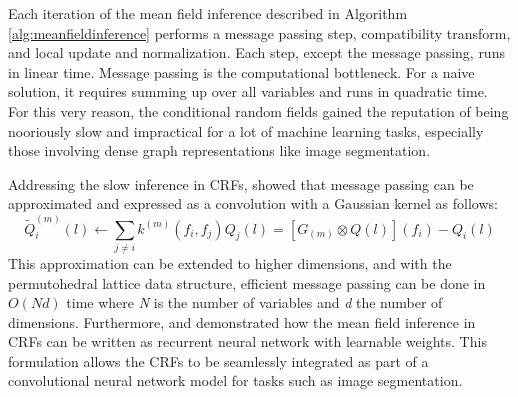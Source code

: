 \documentclass[journal]{IEEEtran}
\begin{document}
Each iteration of the mean field inference described in Algorithm \ref{alg:meanfieldinference} performs a message passing step, compatibility transform, and local update and normalization. Each step, except the message passing, runs in linear time. Message passing is the computational bottleneck. For a naive solution, it requires summing up over all variables and runs in quadratic time. For this very reason, the conditional random fields gained the reputation of being nooriously slow and impractical for a lot of machine learning tasks, especially those involving dense graph representations like image segmentation.

Addressing the slow inference in CRFs, \cite{NIPS2011_4296} showed that message passing can be approximated and expressed as a convolution with a Gaussian kernel as follows:
\begin{equation}
\widetilde{Q}_i^{(m)}(l)\gets \sum_{j\neq i}k^{(m)}(f_i,f_j)Q_j(l) = [G_(m) \otimes Q(l)](f_i) - Q_i(l)
\end{equation}
This approximation can be extended to higher dimensions, and with the permutohedral lattice data structure, efficient message passing can be done in $O(Nd)$ time where \textit{N} is the number of variables and \textit{d} the number of dimensions. 
Furthermore, \cite{crfasrnn_ICCV2015} and \cite{higherordercrf_ECCV2016} demonstrated how the mean field inference in CRFs can be written as recurrent neural network with learnable weights. This formulation allows the CRFs to be seamlessly integrated as part of a convolutional neural network model for tasks such as image segmentation.
\end{document}
